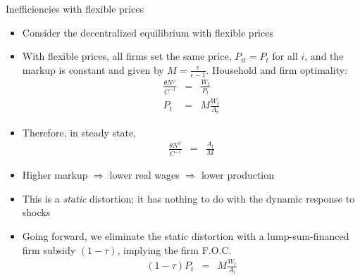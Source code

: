 \documentclass[9pt,xcolor={dvipsnames}]{beamer}
\newcommand{\bit}{\begin{itemize}}
\newcommand{\eit}{\end{itemize}}
\begin{document}
\begin{frame}{Inefficiencies with flexible prices}

\bit
\setlength\itemsep{1em}
\item Consider the decentralized equilibrium with flexible prices

\item With flexible prices, all firms set the same price, $P_{it}=P_t$ for all $i$, and the markup is constant and given by $M= \frac{\epsilon}{\epsilon-1}$. Household and firm optimality:
\begin{eqnarray}
\frac{\theta N^{\varphi}}{C^{-1}} &=& \frac{W_t}{P_t} \nonumber \\
P_t &=& M \frac{W_t}{A_t} \nonumber 
\end{eqnarray}

\item Therefore, in steady state,
\begin{eqnarray}
\frac{\theta N^{\varphi}}{C^{-1}} &=& \frac{A_t}{M} \nonumber 
\end{eqnarray}

\item Higher markup $\Rightarrow$ lower real wages $\Rightarrow$ lower production

\item This is a \emph{static} distortion; it has nothing to do with the dynamic response to shocks

\item Going forward, we eliminate the static distortion with a lump-sum-financed firm subsidy $(1-\tau)$, implying the firm F.O.C.
\begin{eqnarray}
(1-\tau)P_t &=& M \frac{W_t}{A_t} \nonumber 
\end{eqnarray}


\eit

\end{frame}
\end{document}
